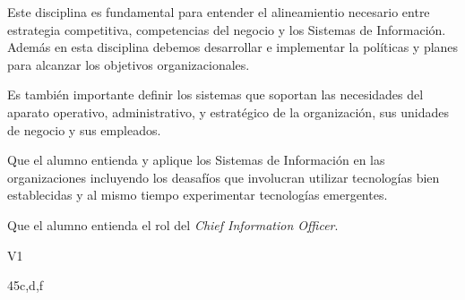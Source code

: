 \begin{syllabus}


\begin{justification}
	Este disciplina es fundamental para entender el alineamientio necesario entre estrategia competitiva, competencias del negocio y los Sistemas de Información. Además en esta disciplina debemos desarrollar e implementar la políticas y planes para alcanzar los objetivos organizacionales.
	
	Es también importante definir los sistemas que soportan las necesidades del aparato operativo, administrativo, y estratégico de la organización, sus unidades de negocio y sus empleados.
	\end{justification}
	
	\begin{goals}
	\item Que el alumno entienda y aplique los Sistemas de Información en las organizaciones incluyendo los deasafíos que involucran utilizar tecnologías bien establecidas y al mismo tiempo experimentar tecnologías emergentes.
	\item Que el alumno entienda el rol del \textit{Chief Information Officer}.
	\end{goals}
	
	\begin{outcomes}{V1}
		\item {}
		\item {}
		\item {}
		\item {}
		\item {}
	\end{outcomes}
	
	\begin{unit}{\LUTWOONEDef}{}{\LUTWOONEBib}{45}{c,d,f}
	   \begin{topics}
			\item \OMCONETopicTWOxONExFOUR
			\item \OMCONETopicTWOxONExFIVE
			\item \OMCTWOTopicTWOxTWOxFIVE
			\item \OMCTWOTopicTWOxTWOxONE
			\item \TDSSEVENTopicTHREExSEVENxFIVE
			\item \TDSONEOHTopicTHREExONEOHxEIGHT
			\item \OMCTWOTopicTWOxTWOxFOUR
	   \end{topics}
		\LUTWOONEGoal
	\end{unit}
	

\end{syllabus}
